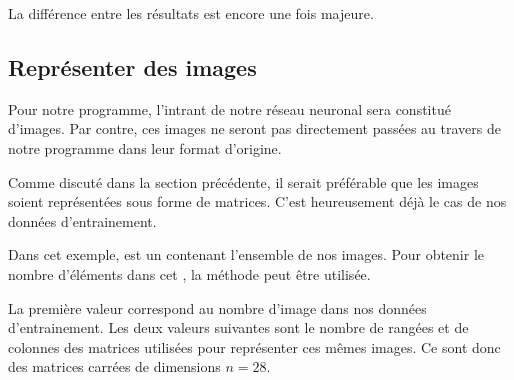 \documentclass[letterpaper,10pt,french]{sphinxmanual}
\begin{document}
La différence entre les résultats est encore une fois majeure.

\begin{sphinxVerbatim}[commandchars=\\\{\}]
     
     
\end{sphinxVerbatim}


\subsection{Représenter des images}
\label{\detokenize{preprocessing:representer-des-images}}
Pour notre programme, l’intrant de notre réseau neuronal sera constitué d’images. Par contre, ces images ne seront pas directement passées au travers de notre programme dans leur format d’origine.

Comme discuté dans la section précédente, il serait préférable que les images soient représentées sous forme de matrices. C’est heureusement déjà le cas de nos données d’entrainement.

\begin{sphinxVerbatim}[commandchars=\\\{\}]
 \PYG{p}{[} \PYG{p}{]} 
\PYG{p}{[} \PYG{p}{]} 
\end{sphinxVerbatim}

Dans cet exemple,  est un  contenant l’ensemble de nos images. Pour obtenir le nombre d’éléments dans cet , la méthode  peut être utilisée.

\begin{sphinxVerbatim}[commandchars=\\\{\}]
 \PYG{p}{[} \PYG{p}{]} 
\PYG{p}{[} \PYG{p}{]}   
\end{sphinxVerbatim}

La première valeur correspond au nombre d’image dans nos données d’entrainement. Les deux valeurs suivantes sont le nombre de rangées et de colonnes des matrices utilisées pour représenter ces mêmes images. Ce sont donc des matrices carrées de dimensions \(n = 28\).
\end{document}
